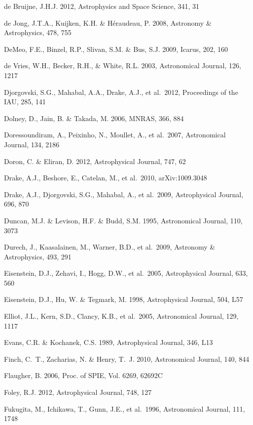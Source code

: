 \documentclass{emulateapj}
\begin{document}
\begin{thebibliography}{}
\bibitem[()]{} de Bruijne, J.H.J. 2012, Astrophysics and Space Science, 341, 31

\bibitem[()]{} de Jong, J.T.A., Kuijken, K.H. \& H\'{e}raudeau, P. 2008, Astronomy \& Astrophysics, 478, 755

\bibitem[()]{} DeMeo, F.E., Binzel, R.P., Slivan, S.M. \& Bus, S.J. 2009, Icarus, 202, 160

\bibitem[()]{} de Vries, W.H., Becker, R.H., \& White, R.L. 2003, Astronomical Journal, 126, 1217

\bibitem[()]{} Djorgovski, S.G., Mahabal, A.A., Drake, A.J., et al.~2012, Proceedings of the IAU, 285, 141

\bibitem[()]{} Dolney, D., Jain, B. \& Takada, M. 2006, MNRAS, 366, 884

\bibitem[()]{} Doressoundiram, A., Peixinho, N., Moullet, A., et al.~2007, Astronomical Journal, 134, 2186

\bibitem[()]{} Doron, C. \& Eliran, D. 2012, Astrophysical Journal, 747, 62

\bibitem[()]{} Drake, A.J., Beshore, E., Catelan, M., et al.~2010, arXiv:1009.3048 

\bibitem[()]{} Drake, A.J., Djorgovski, S.G., Mahabal, A., et al.~2009, Astrophysical Journal, 696, 870

\bibitem[()]{} Duncan, M.J. \& Levison, H.F. \& Budd, S.M. 1995, Astronomical Journal, 110, 3073

\bibitem[()]{} Durech, J., Kaasalainen, M., Warner, B.D., et al.~2009, Astronomy \& Astrophysics, 493, 291

\bibitem[()]{} Eisenstein, D.J., Zehavi, I., Hogg, D.W., et al.~2005, Astrophysical Journal, 633, 560

\bibitem[()]{} Eisenstein, D.J., Hu, W. \& Tegmark, M. 1998, Astrophysical Journal, 504, L57

\bibitem[()]{} Elliot, J.L., Kern, S.D., Clancy, K.B., et al.~2005,  Astronomical Journal, 129, 1117

\bibitem[()]{} Evans, C.R. \& Kochanek, C.S. 1989, Astrophysical Journal, 346, L13

\bibitem[()]{} Finch, C.~T., Zacharias, N. \& Henry, T.~J. 2010, Astronomical Journal, 140, 844

\bibitem[()]{} Flaugher, B. 2006, Proc. of SPIE, Vol. 6269, 62692C

\bibitem[()]{} Foley, R.J. 2012, Astrophysical Journal, 748, 127

\bibitem[()]{} Fukugita, M., Ichikawa, T., Gunn, J.E., et al.~1996, Astronomical Journal, 111, 1748


\end{thebibliography}
\end{document}
